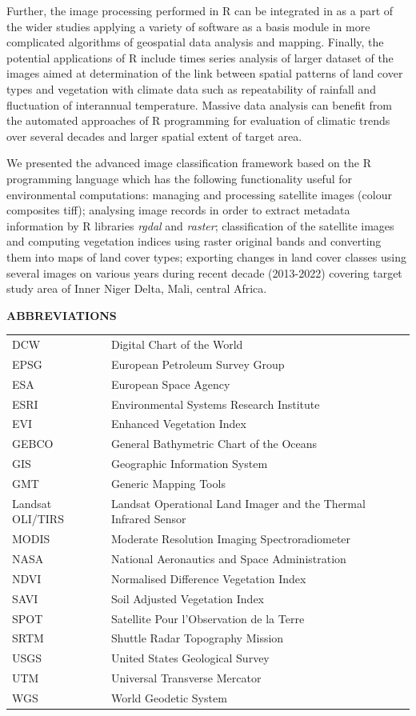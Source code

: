 \documentclass[12pt,a4paper,oneside]{article}
\def \newsection{\vspace{12pt}\textbf}
\def \newpar{\vspace{6pt}}
\begin{document}
\newpar Further, the image processing performed in R can be integrated in as a part of the wider studies applying a variety of software as a basis module in more complicated algorithms of geospatial data analysis and mapping. Finally, the potential applications of R include times series analysis of larger dataset of the images aimed at determination of the link between spatial patterns of land cover types and vegetation with climate data such as repeatability of rainfall and fluctuation of interannual temperature. Massive data analysis can benefit from the automated approaches of R programming for evaluation of climatic trends over several decades and larger spatial extent of target area.

\newpar We presented the advanced image classification framework based on the R programming language which has the following functionality useful for environmental computations: managing and processing satellite images (colour composites tiff); analysing image records in order to extract metadata information by R libraries \emph{rgdal} and \emph{raster}; classification of the satellite images and computing vegetation indices using raster original bands  and converting them into maps of land cover types; exporting changes in land cover classes using several images on various years during recent decade (2013-2022) covering target study area of Inner Niger Delta, Mali, central Africa.

\vspace{12pt}

\newsection {ABBREVIATIONS}
\vspace{12pt}

\begin{tabular}{@{}ll}
DCW & Digital Chart of the World \\
EPSG & European Petroleum Survey Group \\
ESA & European Space Agency \\
ESRI & Environmental Systems Research Institute \\
EVI & Enhanced Vegetation Index \\
GEBCO & General Bathymetric Chart of the Oceans \\
GIS & Geographic Information System \\
GMT & Generic Mapping Tools \\
Landsat OLI/TIRS & Landsat Operational Land Imager and the Thermal Infrared Sensor \\
MODIS & Moderate Resolution Imaging Spectroradiometer \\
NASA & National Aeronautics and Space Administration \\
NDVI & Normalised Difference Vegetation Index \\
SAVI & Soil Adjusted Vegetation Index \\
SPOT & Satellite Pour l'Observation de la Terre \\
SRTM & Shuttle Radar Topography Mission \\
USGS & United States Geological Survey \\
UTM & Universal Transverse Mercator \\
WGS & World Geodetic System \\
\end{tabular}
\end{document}
